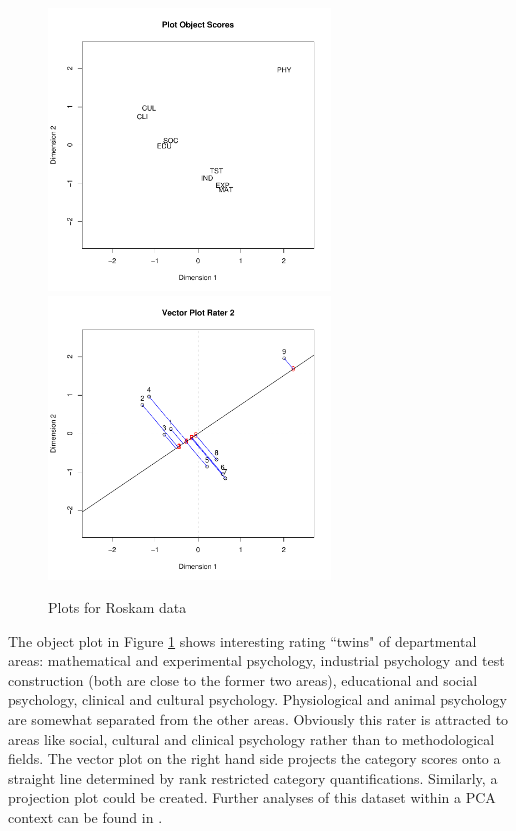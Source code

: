 \documentclass[article]{jss1}
\begin{document}
\begin{figure}[hbt]
\begin{center}
\includegraphics[height=75mm, width=75mm]{roskamobj.pdf}
\includegraphics[height=75mm, width=75mm]{roskamvec.pdf}
\caption{\label{fig:roskam}Plots for Roskam data}
\end{center}
\end{figure}

The object plot in Figure \ref{fig:roskam} shows interesting rating ``twins" of departmental areas: mathematical and experimental psychology, industrial psychology and test construction (both are close to the former two areas), educational and social psychology, clinical and cultural psychology. Physiological and animal psychology are somewhat separated from the other areas. Obviously this rater is attracted to areas like social, cultural and clinical psychology rather than to methodological fields. 
The vector plot on the right hand side projects the category scores onto a straight line determined by rank restricted category quantifications. Similarly, a projection plot could be created. Further analyses of this dataset within a PCA context can be found in \citet{deLeeuw:06}. 
 
\end{document}
